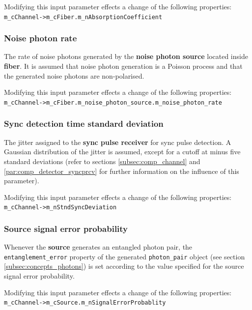 Modifying this input parameter effects a change of the following properties\hyperlink{fn:modinfo}{\footnotemark[\value{fnmodinfo}]}:\\
\texttt{m\_cChannel->m\_cFiber.m\_nAbsorptionCoefficient}

\subsubsection{Noise photon rate}
The rate of noise photons generated by the \textbf{noise photon source} located inside \textbf{fiber}. It is assumed that noise photon generation is a Poisson process and that the generated noise photons are non-polarised.

Modifying this input parameter effects a change of the following properties\hyperlink{fn:modinfo}{\footnotemark[\value{fnmodinfo}]}:\\
\texttt{m\_cChannel->m\_cFiber.m\_noise\_photon\_source.m\_noise\_photon\_rate}

\subsubsection{Sync detection time standard deviation}
The jitter assigned to the \textbf{sync pulse receiver} for sync pulse detection. A Gaussian distribution of the jitter is assumed, except for a cutoff at minus five standard deviations (refer to sections \ref{subsec:comp_channel} and \ref{par:comp_detector_syncprcv} for further information on the influence of this parameter).

Modifying this input parameter effects a change of the following properties\hyperlink{fn:modinfo}{\footnotemark[\value{fnmodinfo}]}:\\
\texttt{m\_cChannel->m\_nStndSyncDeviation}

\subsubsection{Source signal error probability}
Whenever the \textbf{source} generates an entangled photon pair, the \texttt{entanglement\_error} property of the generated \texttt{photon\_pair} object (see section \ref{subsec:concepts_photons}) is set according to the value specified for the source signal error probability.

Modifying this input parameter effects a change of the following properties\hyperlink{fn:modinfo}{\footnotemark[\value{fnmodinfo}]}:\\
\texttt{m\_cChannel->m\_cSource.m\_nSignalErrorProbablity}

